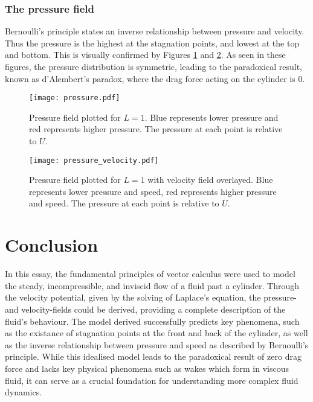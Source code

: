 \subsubsection{The pressure field}
Bernoulli's principle states an inverse relationship between pressure and velocity. Thus the pressure is the highest at the stagnation points,
and lowest at the top and bottom. This is visually confirmed by Figures \ref{figure:pressure:1} and \ref{figure:pressure:2}. As seen in these figures,
the pressure distribution is symmetric, leading to the paradoxical result, known as d'Alembert's paradox, where the drag force acting on the cylinder is $0$.
\begin{figure}
	\centering
	\texttt{[image: pressure.pdf]}
	\caption{Pressure field plotted for $L=1$. Blue represents lower pressure and red represents higher pressure. The pressure at each point is relative to $U$.}
	\label{figure:pressure:1}
\end{figure}
\begin{figure}
	\centering
	\texttt{[image: pressure\_velocity.pdf]}
	\caption{Pressure field plotted for $L=1$ with velocity field overlayed. Blue represents lower pressure and speed, red represents higher pressure and speed. The pressure at each point is relative to $U$.}
	\label{figure:pressure:2}
\end{figure}

\section{Conclusion}
In this essay, the fundamental principles of vector calculus were used to model the steady, incompressible, and inviscid flow of a fluid past a cylinder.
Through the velocity potential, given by the solving of Laplace's equation, the pressure- and velocity-fields could be derived, providing a complete 
description of the fluid's behaviour. The model derived successfully predicts key phenomena, such as the existance of stagnation points at the front and
back of the cylinder, as well as the inverse relationship between pressure and speed as described by Bernoulli's principle. While this idealised model
leads to the paradoxical result of zero drag force and lacks key physical phenomena such as wakes which form in viscous fluid, it can serve as a crucial
foundation for understanding more complex fluid dynamics.